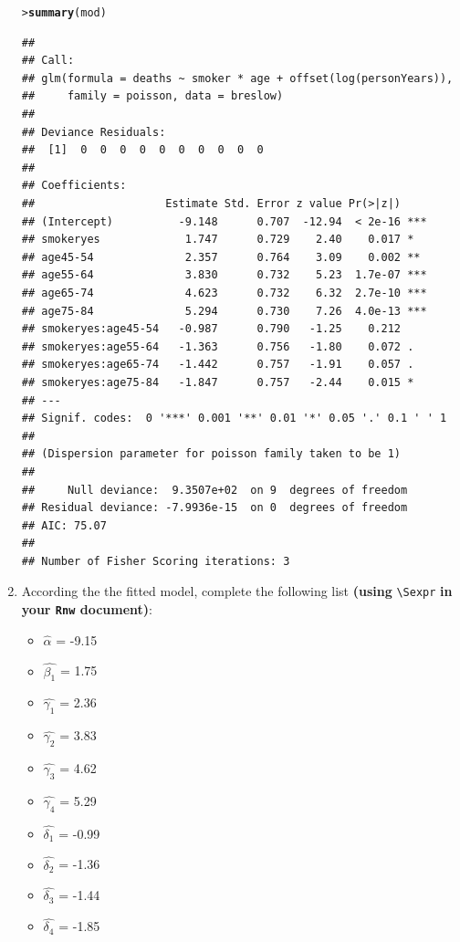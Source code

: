 \documentclass[10pt,a4paper,twoside]{article}\usepackage[]{graphicx}\usepackage[]{xcolor}
\makeatletter
\newcommand{\hlstd}[1]{\textcolor[rgb]{0.345,0.345,0.345}{#1}}%
\newcommand{\hlkwd}[1]{\textcolor[rgb]{0.737,0.353,0.396}{\textbf{#1}}}%
\newenvironment{kframe}{%
 \def\at@end@of@kframe{}%
 \ifinner\ifhmode%
  \def\at@end@of@kframe{\end{minipage}}%
  \begin{minipage}{\columnwidth}%
 \fi\fi%
 \def\FrameCommand##1{\hskip\@totalleftmargin \hskip-\fboxsep
 \colorbox{shadecolor}{##1}\hskip-\fboxsep
     \hskip-\linewidth \hskip-\@totalleftmargin \hskip\columnwidth}%
 \MakeFramed {\advance\hsize-\width
   \@totalleftmargin\z@ \linewidth\hsize
   \@setminipage}}%
 {\par\unskip\endMakeFramed%
 \at@end@of@kframe}
\newenvironment{knitrout}{}{} %
\newcommand{\Robject}[1]{\texttt{#1}}
\makeatother
\begin{document}
\begin{enumerate}
\begin{knitrout}\footnotesize
{}\color{fgcolor}\begin{kframe}
\begin{alltt}
\hlstd{> }\hlkwd{summary}\hlstd{(mod)}
\end{alltt}
\begin{verbatim}
## 
## Call:
## glm(formula = deaths ~ smoker * age + offset(log(personYears)), 
##     family = poisson, data = breslow)
## 
## Deviance Residuals: 
##  [1]  0  0  0  0  0  0  0  0  0  0
## 
## Coefficients:
##                    Estimate Std. Error z value Pr(>|z|)    
## (Intercept)          -9.148      0.707  -12.94  < 2e-16 ***
## smokeryes             1.747      0.729    2.40    0.017 *  
## age45-54              2.357      0.764    3.09    0.002 ** 
## age55-64              3.830      0.732    5.23  1.7e-07 ***
## age65-74              4.623      0.732    6.32  2.7e-10 ***
## age75-84              5.294      0.730    7.26  4.0e-13 ***
## smokeryes:age45-54   -0.987      0.790   -1.25    0.212    
## smokeryes:age55-64   -1.363      0.756   -1.80    0.072 .  
## smokeryes:age65-74   -1.442      0.757   -1.91    0.057 .  
## smokeryes:age75-84   -1.847      0.757   -2.44    0.015 *  
## ---
## Signif. codes:  0 '***' 0.001 '**' 0.01 '*' 0.05 '.' 0.1 ' ' 1
## 
## (Dispersion parameter for poisson family taken to be 1)
## 
##     Null deviance:  9.3507e+02  on 9  degrees of freedom
## Residual deviance: -7.9936e-15  on 0  degrees of freedom
## AIC: 75.07
## 
## Number of Fisher Scoring iterations: 3
\end{verbatim}
\end{kframe}
\end{knitrout}


\item According the the fitted model, complete the following list \textbf{(using} \verb+\Sexpr+ \textbf{in your \Robject{Rnw} document)}:
\begin{itemize}
    \item $\hat{\alpha}$ = -9.15
    \item $\hat{\beta_{1}}$ = 1.75
    \item $\hat{\gamma_{1}}$ = 2.36
    \item $\hat{\gamma_{2}}$ = 3.83
    \item $\hat{\gamma_{3}}$ = 4.62
    \item $\hat{\gamma_{4}}$ = 5.29
    \item $\hat{\delta_{1}}$ = -0.99
    \item $\hat{\delta_{2}}$ = -1.36
    \item $\hat{\delta_{3}}$ = -1.44
    \item $\hat{\delta_{4}}$ = -1.85
\end{itemize}


\end{enumerate}
\end{document}
